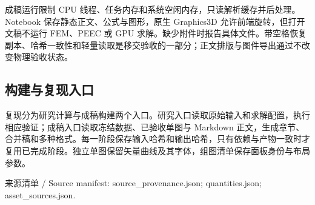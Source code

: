 \documentclass[11pt]{article}
\begin{document}
成稿运行限制 CPU 线程、任务内存和系统空闲内存，只读解析缓存并后处理。Notebook 保存静态正文、公式与图形，原生 Graphics3D 允许前端旋转，但打开文稿不运行 FEM、PEEC 或 GPU 求解。缺少附件时报告具体文件。带空格恢复副本、哈希一致性和轻量读取是移交验收的一部分；正文排版与图件导出通过不改变物理验收状态。


\subsection*{构建与复现入口}
\hypertarget{S3.workflow.heading}{}
复现分为研究计算与成稿构建两个入口。研究入口读取原始输入和求解配置，执行相应验证；成稿入口读取冻结数据、已验收单图与 Markdown 正文，生成章节、合并稿和多种格式。每一阶段保存输入哈希和输出哈希，只有依赖与产物一致时才复用已完成阶段。独立单图保留矢量曲线及其字体，组图清单保存面板身份与布局参数。


来源清单 / Source manifest: source\_provenance.json; quantities.json; asset\_sources.json.
\end{document}
